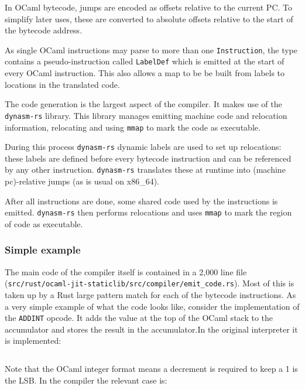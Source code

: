 In OCaml bytecode, jumps are encoded as offsets relative to the current PC. To simplify later uses,
these are converted to absolute offsets relative to the start of the bytecode address.

As single OCaml instructions may parse to more than one \texttt{Instruction}, the type
contains a pseudo-instruction called \texttt{LabelDef} which is emitted at
the start of every OCaml instruction. This also allows a map to be be built from labels to
locations in the translated code.

\label{code-generation}

The code generation is the largest aspect of the compiler. It makes use of the \texttt{dynasm-rs}
library. This library manages emitting machine code and relocation information, relocating and
using \texttt{mmap} to mark the code as executable.

During this process \texttt{dynasm-rs} dynamic labels are used to set up relocations: these
labels are defined before every bytecode instruction and can be referenced by any other
instruction. \texttt{dynasm-rs} translates these at runtime into (machine pc)-relative jumps (as is
usual on x86\_64).

After all instructions are done, some shared code used by the instructions is emitted.
\texttt{dynasm-rs} then performs relocations and uses \texttt{mmap} to mark the region of code as
executable.

\subsubsection{Simple example}

The main code of the compiler itself is contained in a 2,000 line file
(\texttt{src/rust/ocaml-jit-staticlib/src/compiler/emit\_code.rs}). Most of this is taken up by a
Rust large pattern match for each of the bytecode instructions. As a very simple example of what
the code looks like, consider the implementation of the \texttt{ADDINT} opcode. It adds the value
at the top of the OCaml stack to the accumulator and stores the result in the accumulator.In the
original interpreter it is
implemented:

\inputminted{c}{snippets/add.c}

Note that the OCaml integer format means a decrement is required to keep a 1 is the LSB. In the
compiler the relevant case is:

\inputminted{rust}{snippets/add.rs}

